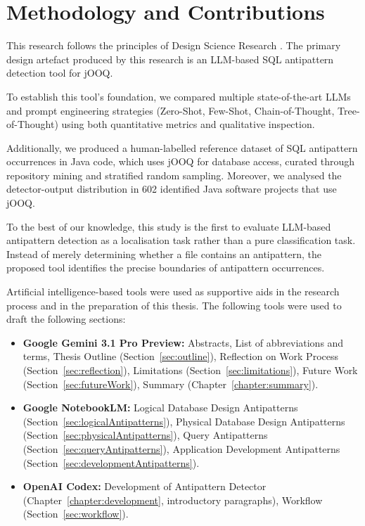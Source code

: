 \section{Methodology and Contributions}

This research follows the principles of Design Science Research . The primary design artefact produced by this research is an LLM-based SQL antipattern detection tool for jOOQ.

To establish this tool's foundation, we compared multiple state-of-the-art LLMs and prompt engineering strategies (Zero-Shot, Few-Shot, Chain-of-Thought, Tree-of-Thought) using both quantitative metrics and qualitative inspection.

Additionally, we produced a human-labelled reference dataset of SQL antipattern occurrences in Java code, which uses jOOQ for database access, curated through repository mining and stratified random sampling. Moreover, we analysed the detector-output distribution in \num{602} identified Java software projects that use jOOQ.

To the best of our knowledge, this study is the first to evaluate LLM-based antipattern detection as a localisation task rather than a pure classification task. Instead of merely determining whether a file contains an antipattern, the proposed tool identifies the precise boundaries of antipattern occurrences.

Artificial intelligence-based tools were used as supportive aids in the research process and in the preparation of this thesis. The following tools were used to draft the following sections:

\begin{itemize}
    \item \textbf{Google Gemini 3.1 Pro Preview:}  Abstracts, List of abbreviations and terms, Thesis Outline (Section~\ref{sec:outline}), Reflection on Work Process (Section~\ref{sec:reflection}), Limitations (Section~\ref{sec:limitations}), Future Work (Section~\ref{sec:futureWork}), Summary (Chapter~\ref{chapter:summary}).
    \item \textbf{Google NotebookLM:}  Logical Database Design Antipatterns (Section~\ref{sec:logicalAntipatterns}), Physical Database Design Antipatterns (Section~\ref{sec:physicalAntipatterns}), Query Antipatterns (Section~\ref{sec:queryAntipatterns}), Application Development Antipatterns (Section~\ref{sec:developmentAntipatterns}).
    \item \textbf{OpenAI Codex:}  Development of Antipattern Detector (Chapter~\ref{chapter:development}, introductory paragraphs), Workflow (Section~\ref{sec:workflow}).
\end{itemize}

